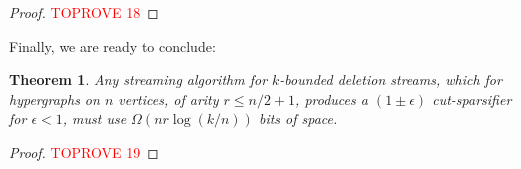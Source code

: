\documentclass[11pt]{article}
\newtheorem{theorem}{Theorem}[section]
\theoremstyle{definition}
\newcommand{\eps}{\epsilon}
\begin{document}
\begin{proof}\textcolor{red}{TOPROVE 18}\end{proof}

Finally, we are ready to conclude:

\begin{theorem}
    Any streaming algorithm for $k$-bounded deletion streams, which for hypergraphs on $n$ vertices, of arity $r \leq n/2+1$, produces a $(1 \pm \eps)$ cut-sparsifier for $\eps < 1$, must use $\Omega(n r \log(k/n))$ bits of space.
\end{theorem}

\begin{proof}\textcolor{red}{TOPROVE 19}\end{proof}

 

\appendix
\end{document}
